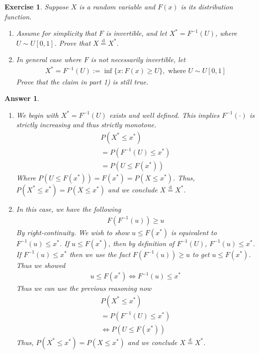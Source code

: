 \documentclass[12pt]{article}
\theoremstyle{colon}
\newtheorem{exercise}{Exercise}
\newtheorem*{answer}{Answer}
\begin{document}
\begin{exercise}
  Suppose $X$ is a random variable and $F(x)$ is its distribution function.
  \begin{enumerate}[label=\arabic*)]
    \item Assume for simplicity that $F$ is invertible, and let $X^* = F^{-1}(U)$, where $U \sim U[0,1]$. Prove that $X \stackrel{\text{d}}{=} X^*$.
    \item In general case where $F$ is not necessarily invertible, let
      \begin{gather*}
        X^* = F^{-1}(U) := \inf \{ x : F(x) \geq U \}, \text{ where } U \sim U[0,1]
      \end{gather*}
      Prove that the claim in part 1) is still true.
  \end{enumerate}
\end{exercise}

\begin{answer}
  \leavevmode
  \begin{enumerate}[label=\arabic*)]
    \item We begin with $X^* = F^{-1}(U)$ exists and well defined. This implies $F^{-1}(\cdot)$ is strictly increasing and thus strictly monotone.
      \begin{gather*}
        P(X^* \leq x^*) \\
        = P(F^{-1}(U) \leq x^*) \\
        = P(U \leq F(x^*))
      \end{gather*}
      Where $P(U \leq F(x^*)) = F(x^*) = P(X \leq x^*)$. Thus, $P(X^* \leq x^*) = P(X \leq x^*)$ and we conclude $X \stackrel{\text{d}}{=} X^*$.
    \item In this case, we have the following
      \begin{gather*}
        F(F^{-1}(u)) \geq u
      \end{gather*}
      By right-continuity. We wish to show $u \leq F(x^*)$ is equivalent to $F^{-1}(u) \leq x^*$. If $u \leq F(x^*)$, then by definition of $F^{-1}(U)$, $F^{-1}(u) \leq x^*$. If $F^{-1}(u) \leq x^*$ then we use the fact $F(F^{-1}(u)) \geq u$ to get $u \leq F(x^*)$. Thus we showed
      \begin{gather*}
        u \leq F(x^*) \Longleftrightarrow F^{-1}(u) \leq x^*
      \end{gather*}
      Thus we can use the previous reasoning now
      \begin{gather*}
        P(X^* \leq x^*) \\
        = P(F^{-1}(U) \leq x^*) \\
        \Longleftrightarrow P(U \leq F(x^*))
      \end{gather*}
      Thus, $P(X^* \leq x^*) = P(X \leq x^*)$ and we conclude $X \stackrel{\text{d}}{=} X^*$.
  \end{enumerate}
\end{answer}
\end{document}
